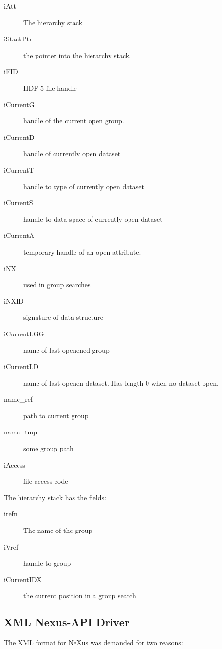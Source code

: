 \documentclass[a4paper]{article}
\begin{document}
\begin{description}\item[iAtt
]  The hierarchy stack
\item[iStackPtr
]  the pointer into the hierarchy stack. 
\item[iFID
]  HDF-5 file handle
\item[iCurrentG
]  handle of the current open group.
\item[iCurrentD
]  handle of currently open dataset
\item[iCurrentT
]  handle to type of currently open dataset
\item[iCurrentS
]  handle to data space of currently open dataset
\item[iCurrentA
]  temporary handle of an open attribute.
\item[iNX
]   used in group searches
\item[iNXID
]  signature of data structure
\item[iCurrentLGG
]  name of last openened group
\item[iCurrentLD
]  name of last openen dataset. Has length 0 when no dataset open.
\item[name\_ref
]  path to current group
\item[name\_tmp
]  some group path
\item[iAccess
]  file access code
\end{description}The hierarchy stack has the fields:


\begin{description}\item[irefn
]  The name of the group
\item[iVref
]  handle to group 
\item[iCurrentIDX
]  the current position in a group search
\end{description}\subsection{XML Nexus-API Driver }
The XML format for NeXus was demanded for two reasons:
\end{document}

